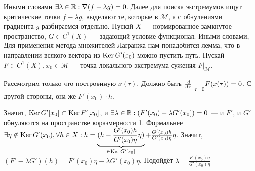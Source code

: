 \documentclass[a4paper]{article}
\begin{document}
    Иными словами $\exists \lambda\in\mathbb{R}: \nabla(f - \lambda g) = 0$.
    Далее для поиска экстремумов ищут критические точки $f - \lambda g$, выделяют те, которые в $\mathcal{M}$, а с обнулениями градиента $g$ разбираемся отдельно.
\ok
    Пускай $X$ --- нормированное замкнутое пространство, $G \in C^1(X)$ --- задающий условие функционал.
    Иными словами,
    Для применения метода множителей Лагранжа нам понадобится лемма, что в направлении всякого вектора из $\operatorname{Ker} G'(x_0)$ можно пустить путь.
    Пускай $F \in C^1(X), x_0 \in \mathcal{M}$ --- точка локального экстремума сужения $F\big|_{\mathcal{M}}$.

    Рассмотрим только что построенную $x(\tau)$.
    Должно быть $\frac{\operatorname{d}\!}{\operatorname{d}\! \tau}\Big|_{\tau = 0}F(x(\tau)) = 0$.
    С другой стороны, она же $F'(x_0)\cdot h$.

    Значит, $\operatorname{Ker} G'[x_0] \subset \operatorname{Ker} F'[x_0]$, и $\exists \lambda \in \mathbb{R}: (F'(x_0) - \lambda G'(x_0)) = 0$ --- и $F'$, и $G'$ обнуляются на пространстве коразмерности 1.
    Формальнее $\exists \eta \notin \operatorname{Ker} G'(x_0), \forall h \in X: h = \underbrace{(h - \frac{G'(x_0)h}{G'(x_0)\eta}\eta)}_{\in \operatorname{Ker} G'[x_0]} + \frac{G'(x_0)h}{G'(x_0)\eta}\eta$.
    Значит, $(F' - \lambda G')(h) = F'(x_0) \eta - \lambda G'(x_0)\eta$.
    Подойдёт $\lambda = \frac{F'(x_0)\eta}{G'(x_0)\eta}$
\end{document}
